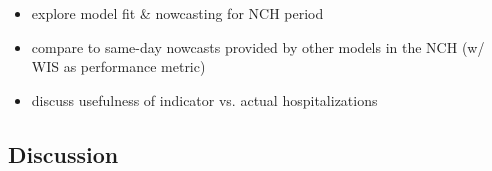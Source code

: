 

\begin{itemize}
    \item explore model fit \& nowcasting for NCH period
    \item compare to same-day nowcasts provided by other models in the NCH (w/ WIS as performance metric)
    \item discuss usefulness of indicator vs. actual hospitalizations
\end{itemize}

\subsection{Discussion}